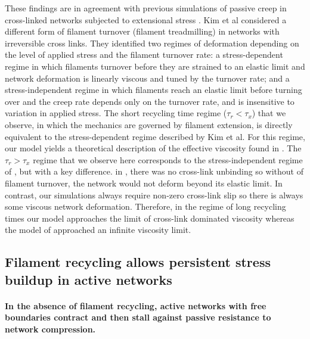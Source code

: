 \documentclass[10pt,letterpaper]{article}
\begin{document}
These findings are in agreement with previous simulations of passive creep in cross-linked networks subjected to extensional stress  \cite{Kim2014526} .  Kim et al considered  a different form of filament turnover (filament treadmilling) in networks with irreversible cross links. They identified two regimes of deformation depending on the level of applied stress and the filament turnover rate: a stress-dependent regime in which filaments turnover before they are strained to an elastic limit and network deformation is linearly viscous and tuned by the turnover rate; and a stress-independent regime in which filaments reach an elastic limit before turning over and the creep rate depends only on the turnover rate, and is insensitive to variation in applied stress. The short recycling time regime ($\tau_r < \tau_x$) that we observe, in which the mechanics are governed by filament extension, is directly equivalent to the stress-dependent regime described by Kim et al. For this regime, our model yields a theoretical description of the effective viscosity found in \cite{Kim2014526}. The $\tau_r > \tau_x$ regime that we observe here corresponds to the stress-independent regime of \cite{Kim2014526}, but with a key difference.   in \cite{Kim2014526}, there was no cross-link unbinding so without of filament turnover, the network would not deform beyond its elastic limit. In contrast, our simulations always require non-zero cross-link slip so there is always some viscous network deformation. Therefore, in the regime of long recycling times our model approaches the limit of cross-link dominated viscosity whereas the model of \cite{Kim2014526} approached an infinite viscosity limit.






\subsection*{Filament recycling allows persistent stress buildup in active networks}

\paragraph{In the absence of filament recycling, active networks with free boundaries contract and then stall against passive resistance to network compression.}
\end{document}
